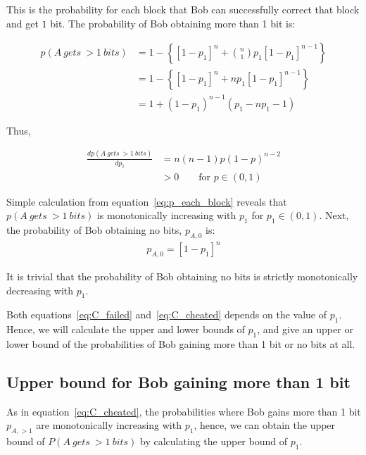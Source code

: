 \documentclass[%
 reprint,
superscriptaddress,
 amsmath,amssymb,
 aps,
]{revtex4-2}
\begin{document}
This is the probability for each block that Bob can successfully correct that block and get $1$ bit. The probability of Bob obtaining more than 1 bit is:

\begin{equation}
\begin{split}
    p(A\ gets\ > 1\ bits) &= 1-\left\{[1-p_1]^n+ \binom{n}{1} p_1[1-p_1]^{n-1}\right\}\\ 
    &= 1-\left\{[1-p_1]^n+np_1[1-p_1]^{n-1}\right\}\\
    &=1 + (1 - p_1)^{n-1} (p_1 - n p_1 - 1)
\end{split}
\label{eq:C_cheated}
\end{equation}

Thus, 

\begin{equation}
\begin{split}
    \frac{dp(A\ gets\ > 1\ bits)}{dp_1}&=n(n-1)p(1 - p)^{n-2}\\
    &>0\qquad \text{for $p\in(0, 1)$}
\end{split}
\end{equation}

Simple calculation from equation~\ref{eq:p_each_block} reveals that $p(A\ gets\ > 1\ bits)$ is monotonically increasing with $p_1$ for $p_1\in(0, 1)$. Next, the probability of Bob obtaining no bits, $p_{A, 0}$ is:
\begin{equation}
\begin{split}
    p_{A, 0} =[1-p_1]^n
    \label{eq:C_failed}
\end{split}
\end{equation}

It is trivial that the probability of Bob obtaining no bits is strictly monotonically decreasing with $p_1$.

Both equations~\ref{eq:C_failed} and~\ref{eq:C_cheated} depends on the value of $p_1$. Hence, we will calculate the upper and lower bounds of $p_1$, and give an upper or lower bound of the probabilities of Bob gaining more than 1 bit or no bits at all.

\subsection{Upper bound for Bob gaining more than 1 bit}
\label{sec:Bob_get_more_info}
As in equation~\ref{eq:C_cheated}, the probabilities where Bob gains more than 1 bit $p_{A, >1}$ are monotonically increasing with $p_1$, hence, we can obtain the upper bound of $P(A\ gets\ > 1\ bits)$ by calculating the upper bound of $p_1$.
\end{document}
